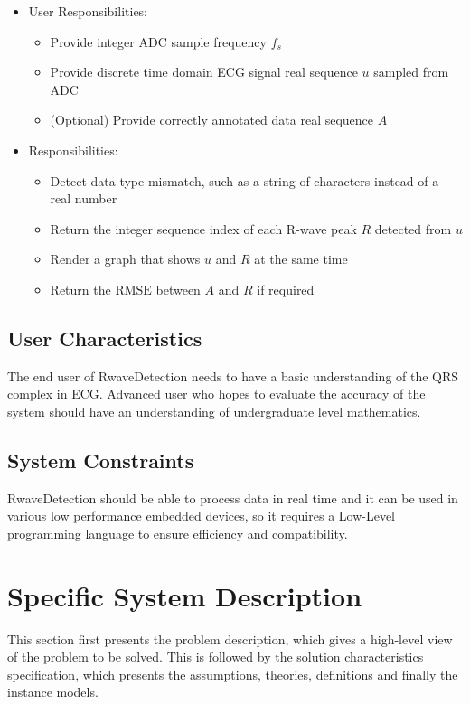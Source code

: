 \documentclass[12pt]{article}
\begin{document}
\begin{itemize}
\item User Responsibilities:
\begin{itemize}
\item Provide integer ADC sample frequency $f_s$
\item Provide discrete time domain ECG signal real sequence $u$ sampled from ADC
\item (Optional) Provide correctly annotated data real sequence $A$
\end{itemize}
\item \progname{} Responsibilities:
\begin{itemize}
\item Detect data type mismatch, such as a string of characters instead of a
  real number
\item Return the integer sequence index of each R-wave peak $R$ detected from
$u$
\item Render a graph that shows $u$ and $R$ at the same time
\item Return the $\text{RMSE}$ between $A$ and $R$ if required
\end{itemize}
\end{itemize}

\subsection{User Characteristics} \label{SecUserCharacteristics}

The end user of RwaveDetection needs to have a basic understanding of the QRS
complex in ECG.  Advanced user who hopes to evaluate the accuracy of the system
should have an understanding of undergraduate level mathematics.

\subsection{System Constraints}

RwaveDetection should be able to process data in real time and it can be used in
various low performance embedded devices, so it requires a Low-Level programming
language to ensure efficiency and compatibility.

\section{Specific System Description}

This section first presents the problem description, which gives a high-level
view of the problem to be solved.  This is followed by the solution
characteristics specification, which presents the assumptions, theories,
definitions and finally the instance models.
\end{document}
